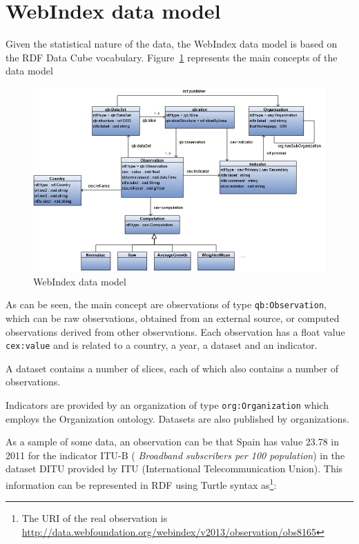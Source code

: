 \documentclass{llncs}
\begin{document}
\section{WebIndex data model}

Given the statistical nature of the data, the WebIndex data model is based on the RDF Data Cube vocabulary. Figure~\ref{Model} represents the main concepts of the data model

\begin{figure}[h]
\label{Model}
\begin{center}
\includegraphics[width=\textwidth]{Model}
\end{center}
\caption{WebIndex data model}
\end{figure}

As can be seen, the main concept are observations of type \lstinline|qb:Observation|, which 
can be raw observations,
obtained from an external source, 
or computed observations derived from other observations. 
Each observation has a float value \lstinline|cex:value| 
and is related to a country, a year, a dataset 
and an indicator.

A dataset contains a number of slices, each of which also contains a number of observations. 

Indicators are provided by an organization of type \lstinline|org:Organization| which employs the Organization ontology\cite{Organization14}. Datasets are also published by organizations. 

As a sample of some data, 
an observation can be that Spain has value 23.78 in 2011 for the indicator ITU-B ( \emph{Broadband subscribers per 100 population}) in the dataset DITU provided by ITU (International Telecommunication Union). This information can be represented in RDF using Turtle syntax as\footnote{The URI of the real observation is \url{http://data.webfoundation.org/webindex/v2013/observation/obs8165}}:
\end{document}
